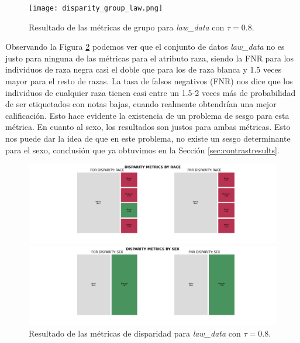 \begin{figure}[h]
	\hspace{-2.5cm}
	\texttt{[image: disparity\_group\_law.png]}
	\caption{Resultado de las métricas de grupo para \textit{law\_data} con $\tau=0.8$.}
    \label{fig:lawdgroup}
\end{figure}

\clearpage

Observando la Figura \ref{fig:lawdisparity} podemos ver que el conjunto de datos \textit{law\_data} no es justo para ninguna de las métricas para el atributo raza, siendo la FNR para los individuos de raza negra casi el doble que para los de raza blanca y 1.5 veces mayor para el resto de razas. La tasa de falsos negativos (FNR) nos dice que los individuos de cualquier raza tienen casi entre un 1.5-2 veces más de probabilidad de ser etiquetados con notas bajas, cuando realmente obtendrían una mejor calificación. Esto hace evidente la existencia de un problema de sesgo para esta métrica.  En cuanto al sexo, los resultados son justos para ambas métricas. Esto nos puede dar la idea de que en este problema, no existe un sesgo determinante para el sexo, conclusión que ya obtuvimos en la Sección \ref{sec:contrastresults}.\\

\begin{figure}[h]
	\hspace{-2.5cm}
	\includegraphics[width=21.3cm]{images/disparity_law_race.png}
	
	\hspace{-2.5cm}
	\includegraphics[width=21.3cm]{images/disparity_law_sex.png}
	\caption{Resultado de las métricas de disparidad para \textit{law\_data} con $\tau=0.8$.}
    \label{fig:lawdisparity}
\end{figure}